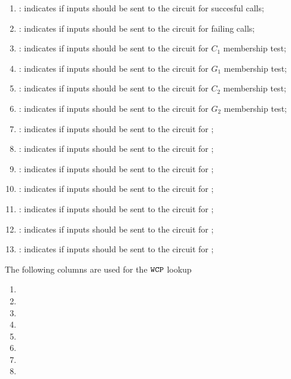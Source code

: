 \begin{enumerate}[resume]
    \item
        \both{\csPointEvaluation}:
        indicates if inputs should be sent to the circuit for succesful \inst{\prcNamePointEvaluation} calls;
    \item
        \both{\csPointEvaluationFailure}:
        indicates if inputs should be sent to the circuit for failing \inst{\prcNamePointEvaluation} calls;
    \item
        \both{\csCOne}:
        indicates if inputs should be sent to the circuit for $C_1$ membership test;
    \item
        \both{\csGOne}:
        indicates if inputs should be sent to the circuit for $G_1$ membership test;
    \item
        \both{\csCTwo}:
        indicates if inputs should be sent to the circuit for $C_2$ membership test;
    \item
        \both{\csGTwo}:
        indicates if inputs should be sent to the circuit for $G_2$ membership test;
    \item
        \both{\csPairing}:
        indicates if inputs should be sent to the circuit for \inst{\prcNameBlsPairingCheck};
    \item
        \both{\csGOneAdd}:
        indicates if inputs should be sent to the circuit for \inst{\prcNameBlsGOneAdd};
    \item
        \both{\csGTwoAdd}:
        indicates if inputs should be sent to the circuit for \inst{\prcNameBlsGTwoAdd};
    \item
        \both{\csGOneMsm}:
        indicates if inputs should be sent to the circuit for \inst{\prcNameBlsGOneMsm};
    \item
        \both{\csGTwoMsm}:
        indicates if inputs should be sent to the circuit for \inst{\prcNameBlsGTwoMsm};
    \item
        \both{\csMapFpToGOne}:
        indicates if inputs should be sent to the circuit for \inst{\prcNameBlsMapFpToGOne};
    \item
        \both{\csMapFpTwoToGTwo}:
        indicates if inputs should be sent to the circuit for \inst{\prcNameBlsMapFpTwoToGTwo};
\end{enumerate}
The following columns are used for the $\texttt{WCP}$ lookup
\begin{multicols}{2}
    \begin{enumerate}[resume]
        \item \wcpFlag
        \item \wcpArgOneHi
        \item \wcpArgOneLo
        \item \wcpArgTwoHi
        \item \wcpArgTwoLo
        \item \wcpRes
        \item \wcpInst
        \item[\vspace{\fill}]
    \end{enumerate}
\end{multicols}
